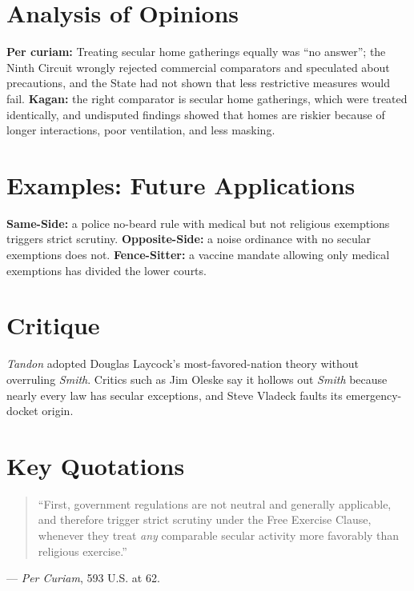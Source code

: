 \documentclass[12pt]{article}
\begin{document}
\section{Analysis of Opinions}
\textbf{Per curiam:} Treating secular home gatherings equally was ``no answer''; the Ninth Circuit wrongly rejected commercial comparators and speculated about precautions, and the State had not shown that less restrictive measures would fail. \textbf{Kagan:} the right comparator is secular home gatherings, which were treated identically, and undisputed findings showed that homes are riskier because of longer interactions, poor ventilation, and less masking.

\section{Examples: Future Applications}
\textbf{Same-Side:} a police no-beard rule with medical but not religious exemptions triggers strict scrutiny. \textbf{Opposite-Side:} a noise ordinance with no secular exemptions does not. \textbf{Fence-Sitter:} a vaccine mandate allowing only medical exemptions has divided the lower courts.

\section{Critique}
\textit{Tandon} adopted Douglas Laycock's most-favored-nation theory without overruling \textit{Smith}. Critics such as Jim Oleske say it hollows out \textit{Smith} because nearly every law has secular exceptions, and Steve Vladeck faults its emergency-docket origin.

\section{Key Quotations}
\begin{quote}
``First, government regulations are not neutral and generally applicable, and therefore trigger strict scrutiny under the Free Exercise Clause, whenever they treat \textit{any} comparable secular activity more favorably than religious exercise.''
\end{quote}
\noindent --- \textit{Per Curiam}, 593 U.S. at 62.
\end{document}
